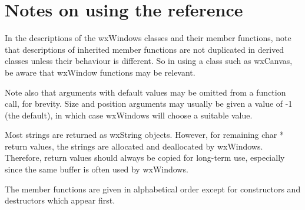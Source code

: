 \section{Notes on using the reference}\label{referencenotes}

In the descriptions of the wxWindows classes and their member
functions, note that descriptions of inherited member functions are not
duplicated in derived classes unless their behaviour is different. So in
using a class such as wxCanvas, be aware that wxWindow functions may be
relevant.

Note also that arguments with default values may be omitted from a
function call, for brevity. Size and position arguments may usually be
given a value of -1 (the default), in which case wxWindows will choose a
suitable value.

Most strings are returned as wxString objects. However, for remaining
char * return values, the strings are allocated and
deallocated by wxWindows. Therefore, return values should always be
copied for long-term use, especially since the same buffer is often
used by wxWindows.

The member functions are given in alphabetical order except for
constructors and destructors which appear first.

